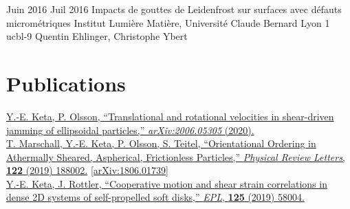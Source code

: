 \documentclass[letterpaper]{cvtemplate_fr} %
\begin{document}
\begin{cvbody}
\cvitem
	{Juin 2016}
	{Juil 2016}
	{Impacts de gouttes de Leidenfrost sur surfaces avec d\'efauts microm\'etriques}
	{Institut Lumi\`ere Mati\`ere, Universit\'e Claude Bernard Lyon 1 }
	{ucbl}{}{-9}
	{Quentin Ehlinger, Christophe Ybert}

\end{cvbody}


\section{Publications}

\parbox[t]{\textwidth}{

\href{https://arxiv.org/abs/2006.05305}{Y.-E. Keta, P. Olsson, ``Translational and rotational velocities in shear-driven jamming of ellipsoidal particles,'' \textit{arXiv:2006.05305} (2020).}\\

\href{https://doi.org/10.1103/PhysRevLett.122.188002}{T. Marschall, Y.-E. Keta, P. Olsson, S. Teitel, ``Orientational Ordering in Athermally Sheared, Aspherical, Frictionless Particles,'' \textit{Physical Review Letters}, \textbf{122} (2019) 188002.} \href{https://arxiv.org/abs/1806.01739}{[arXiv:1806.01739]}\\

\href{https://doi.org/10.1209/0295-5075/125/58004}{Y.-E. Keta, J. Rottler, ``Cooperative motion and shear strain correlations in dense 2D systems of self-propelled soft disks,'' \textit{EPL}, \textbf{125} (2019) 58004.}\\

}
\end{document}
